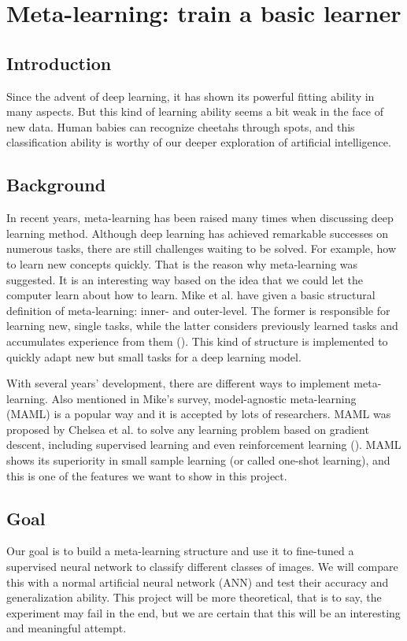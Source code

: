 \documentclass[../proposal.tex]{subfiles}
\begin{document}
\section{Meta-learning: train a basic learner}
\subsection{Introduction}
Since the advent of deep learning, it has shown its powerful fitting ability in
many aspects. But this kind of learning ability seems a bit weak in the face of
new data. Human babies can recognize cheetahs through spots, and this
classification ability is worthy of our deeper exploration of artificial
intelligence.

\subsection{Background}
In recent years, meta-learning has been raised many times when discussing deep
learning method. Although deep learning has achieved remarkable successes on
numerous tasks, there are still challenges waiting to be solved. For example,
how to learn new concepts quickly. That is the reason why meta-learning was
suggested. It is an interesting way based on the idea that we could let the
computer learn about how to learn. Mike et al. have given a basic structural
definition of meta-learning: inner- and outer-level. The former is responsible
for learning new, single tasks, while the latter considers previously learned
tasks and accumulates experience from them (\cite{huisman2020survey}). This kind
of structure is implemented to quickly adapt new but small tasks for a deep
learning model.

With several years' development, there are different ways to implement
meta-learning. Also mentioned in Mike's survey, model-agnostic meta-learning
(MAML) is a popular way and it is accepted by lots of researchers. MAML was
proposed by Chelsea et al. to solve any learning problem based on gradient
descent, including supervised learning and even reinforcement learning
(\cite{finn2017model}). MAML shows its superiority in small sample learning
(or called one-shot learning), and this is one of the features we want to show
in this project.

\subsection{Goal}
Our goal is to build a meta-learning structure and use it to fine-tuned a
supervised neural network to classify different classes of images. We will
compare this with a normal artificial neural network (ANN) and test their
accuracy and generalization ability. This project will be more theoretical,
that is to say, the experiment may fail in the end, but we are certain that
this will be an interesting and meaningful attempt.
\end{document}
